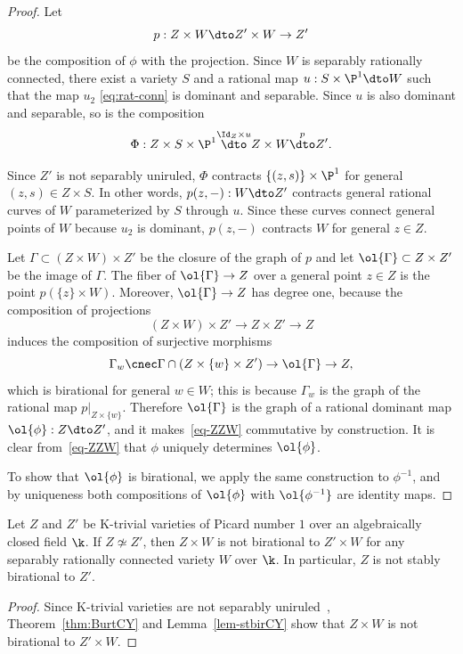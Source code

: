 \begin{proof}

Let
$$p: Z \times W \dto Z' \times W \to  Z' $$
be the composition of $\phi$ with the projection.
Since $W$ is separably rationally connected,
there exist a variety $S$ and a rational map
$u : S \times \P^1 \dto W$ such that
the map $u_2$ \eqref{eq:rat-conn}
is dominant and separable.
Since $u$ is also dominant and separable,
so is the composition
$$\Phi: Z \times S \times \P^1
\overset{\Id_Z \times u}{\dto} Z  \times W
\overset{p}{\dto} Z'.$$

Since $Z'$ is not separably uniruled, $\Phi$ contracts
$\{(z, s)\} \times \P^1$ for general $(z, s) \in Z \times S$.
In other words, $p(z,-): W \dto Z'$
contracts general rational curves of $W$ parameterized
by $S$ through $u$.
Since these curves connect general points of $W$
because $u_2$ is dominant,
$p(z,-)$ contracts $W$ for general $z \in Z$.

Let $\Gamma \subset (Z \times W) \times Z'$ be the closure of the graph
of $p$ and let $\ol{\Gamma} \subset Z \times Z'$
be the image of $\Gamma$.
The fiber of $\ol{\Gamma} \to Z$ over a general point
$z \in Z$ is the point
$p(\{z\} \times W)$.
Moreover, $\ol{\Gamma} \to Z$ has degree one,
because the composition of projections
$$(Z \times W) \times Z' \to Z \times Z' \to Z$$
induces the composition of surjective morphisms
$$\Gamma_w \cnec \Gamma \cap (Z \times \{w\} \times Z')
\to \ol{\Gamma} \to Z,$$
which is birational for general $w \in W$;
this is because $\Gamma_w$ is the graph of the rational
map $p|_{Z \times \{w\}}$.
Therefore $\ol{\Gamma}$
is the graph of a rational dominant map $\ol{\phi}: Z \dto Z'$,
and it makes~\eqref{eq-ZZW} commutative by construction.
It is clear from~\eqref{eq-ZZW} that $\phi$ uniquely determines $\ol{\phi}$.

To show that $\ol{\phi}$ is birational,
we apply the same construction
to $\phi^{-1}$, and by uniqueness
both compositions of
$\ol{\phi}$ with
$\ol{\phi^{-1}}$ are identity maps.
\end{proof}




\begin{cor}
\notready\label{cor-CYnSB}
Let $Z$ and $Z'$ be K-trivial varieties
of Picard number $1$
over
an algebraically closed field $\k$.
If $Z \not\simeq Z'$,
then $Z \times W$ is not birational to $Z' \times W$
for any separably rationally connected variety $W$ over $\k$.
In particular, $Z$ is not stably birational to $Z'$.
\end{cor}




\begin{proof}

Since K-trivial varieties are not separably uniruled~\cite[Corollary IV.1.11]{Kollarrat},
Theorem~\ref{thm:BurtCY}
and Lemma~\ref{lem-stbirCY} show that
$Z \times W$ is not birational to $Z' \times W$.
\end{proof}
